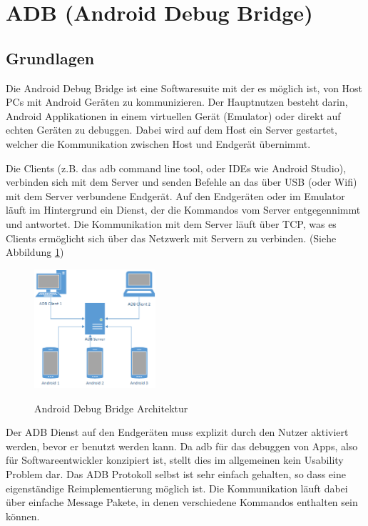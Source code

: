 \documentclass[12pt,journal,compsoc]{IEEEtran}
\begin{document}
\section{ADB (Android Debug Bridge)}
\subsection{Grundlagen}
Die Android Debug Bridge ist eine Softwaresuite mit der es möglich ist, von Host PCs mit Android Geräten zu kommunizieren.
Der Hauptnutzen besteht darin, Android Applikationen in einem virtuellen Gerät (Emulator) oder direkt auf echten Geräten zu debuggen.
Dabei wird auf dem Host ein Server gestartet, welcher die Kommunikation zwischen Host und Endgerät übernimmt. 

Die Clients (z.B. das adb command line tool, oder IDEs wie Android Studio), verbinden sich mit dem Server und senden Befehle an das über USB (oder Wifi) mit dem Server verbundene Endgerät.
Auf den Endgeräten oder im Emulator läuft im Hintergrund ein Dienst, der die Kommandos vom Server entgegennimmt und antwortet. Die Kommunikation mit dem Server läuft über TCP,
was es Clients ermöglicht sich über das Netzwerk mit Servern zu verbinden. (Siehe Abbildung \ref{adb})
\begin{figure}
	\centering
	\caption{Android Debug Bridge Architektur}
	\includegraphics[width=0.4\textwidth]{media/adb.png}	
	\label{adb}
\end{figure}

Der ADB Dienst auf den Endgeräten muss explizit durch den Nutzer aktiviert werden, bevor er benutzt werden kann.
Da adb für das debuggen von Apps, also für Softwareentwickler konzipiert ist, stellt dies im allgemeinen kein Usability Problem dar. 
Das ADB Protokoll selbst ist sehr einfach gehalten, so dass eine eigenständige Reimplementierung möglich ist.
Die Kommunikation läuft dabei über einfache Message Pakete, in denen verschiedene Kommandos enthalten sein können.
\lstset{language=C,
	basicstyle=\ttfamily\scriptsize
}

  
\end{document}
